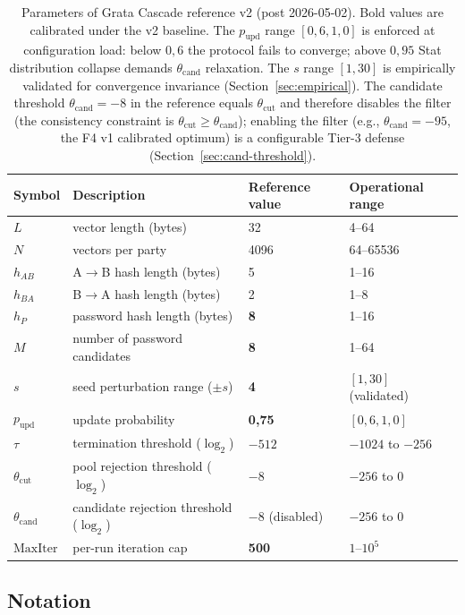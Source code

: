 \documentclass[11pt,a4paper]{article}
\begin{document}
\begin{table}[ht]
\centering
\small
\begin{tabular}{llll}
\toprule
Symbol & Description & Reference value & Operational range \\
\midrule
$L$ & vector length (bytes) & 32 & 4--64 \\
$N$ & vectors per party & 4096 & 64--65536 \\
$h_{AB}$ & A$\to$B hash length (bytes) & 5 & 1--16 \\
$h_{BA}$ & B$\to$A hash length (bytes) & 2 & 1--8 \\
$h_P$ & password hash length (bytes) & \textbf{8} & 1--16 \\
$M$ & number of password candidates & \textbf{8} & 1--64 \\
$s$ & seed perturbation range ($\pm s$) & \textbf{4} & $[1, 30]$ (validated) \\
$p_\text{upd}$ & update probability & \textbf{0{,}75} & $[0{,}6, 1{,}0]$ \\
$\tau$ & termination threshold ($\log_2$) & $-512$ & $-1024$ to $-256$ \\
$\theta_{\text{cut}}$ & pool rejection threshold ($\log_2$) & $-8$ & $-256$ to $0$ \\
$\theta_{\text{cand}}$ & candidate rejection threshold ($\log_2$) & \textbf{$-8$} (disabled) & $-256$ to $0$ \\
$\text{MaxIter}$ & per-run iteration cap & \textbf{500} & $1$--$10^5$ \\
\bottomrule
\end{tabular}
\caption{Parameters of Grata Cascade reference v2 (post 2026-05-02). Bold values are calibrated under the v2 baseline. The $p_\text{upd}$ range $[0{,}6, 1{,}0]$ is enforced at configuration load: below $0{,}6$ the protocol fails to converge; above $0{,}95$ Stat distribution collapse demands $\theta_{\text{cand}}$ relaxation. The $s$ range $[1, 30]$ is empirically validated for convergence invariance (Section~\ref{sec:empirical}). The candidate threshold $\theta_{\text{cand}} = -8$ in the reference equals $\theta_{\text{cut}}$ and therefore disables the filter (the consistency constraint is $\theta_{\text{cut}} \geq \theta_{\text{cand}}$); enabling the filter (e.g., $\theta_{\text{cand}} = -95$, the F4 v1 calibrated optimum) is a configurable Tier-3 defense (Section~\ref{sec:cand-threshold}).}
\label{tab:params}
\end{table}

\subsection{Notation}
\end{document}
